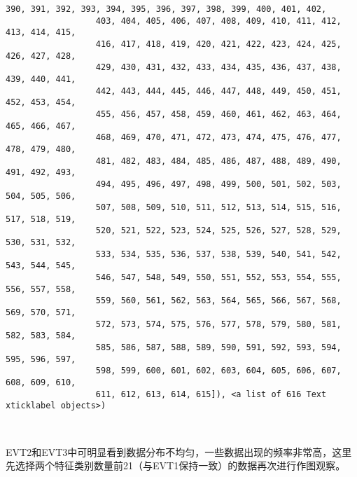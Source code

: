 \documentclass[11pt]{article}
\begin{document}
\begin{Verbatim}[commandchars=\\\{\}]
                  390, 391, 392, 393, 394, 395, 396, 397, 398, 399, 400, 401, 402,
                  403, 404, 405, 406, 407, 408, 409, 410, 411, 412, 413, 414, 415,
                  416, 417, 418, 419, 420, 421, 422, 423, 424, 425, 426, 427, 428,
                  429, 430, 431, 432, 433, 434, 435, 436, 437, 438, 439, 440, 441,
                  442, 443, 444, 445, 446, 447, 448, 449, 450, 451, 452, 453, 454,
                  455, 456, 457, 458, 459, 460, 461, 462, 463, 464, 465, 466, 467,
                  468, 469, 470, 471, 472, 473, 474, 475, 476, 477, 478, 479, 480,
                  481, 482, 483, 484, 485, 486, 487, 488, 489, 490, 491, 492, 493,
                  494, 495, 496, 497, 498, 499, 500, 501, 502, 503, 504, 505, 506,
                  507, 508, 509, 510, 511, 512, 513, 514, 515, 516, 517, 518, 519,
                  520, 521, 522, 523, 524, 525, 526, 527, 528, 529, 530, 531, 532,
                  533, 534, 535, 536, 537, 538, 539, 540, 541, 542, 543, 544, 545,
                  546, 547, 548, 549, 550, 551, 552, 553, 554, 555, 556, 557, 558,
                  559, 560, 561, 562, 563, 564, 565, 566, 567, 568, 569, 570, 571,
                  572, 573, 574, 575, 576, 577, 578, 579, 580, 581, 582, 583, 584,
                  585, 586, 587, 588, 589, 590, 591, 592, 593, 594, 595, 596, 597,
                  598, 599, 600, 601, 602, 603, 604, 605, 606, 607, 608, 609, 610,
                  611, 612, 613, 614, 615]), <a list of 616 Text xticklabel objects>)
\end{Verbatim}
            
    \begin{center}
    \end{center}
    { \hspace*{\fill} \\}
    
    EVT2和EVT3中可明显看到数据分布不均匀，一些数据出现的频率非常高，这里先选择两个特征类别数量前21（与EVT1保持一致）的数据再次进行作图观察。
\end{document}
